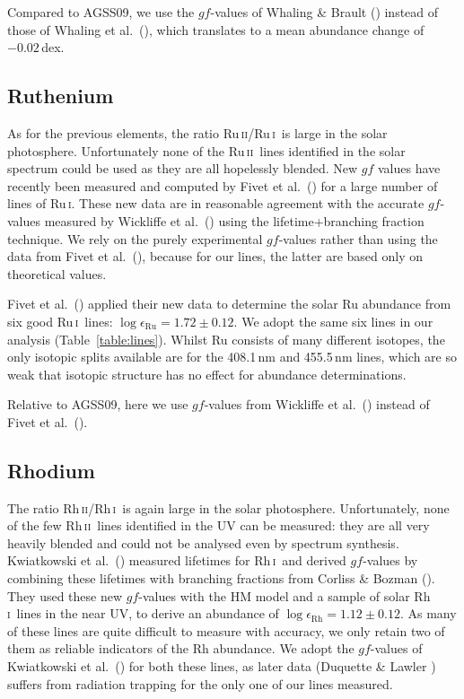 \documentclass[traditabstract]{aa}
\newcommand{\altrui}{Ru\,\textsc{i}}
\newcommand{\altruii}{Ru\,\textsc{ii}}
\newcommand{\altrhi}{Rh\,\textsc{i}}
\newcommand{\altrhii}{Rh\,\textsc{ii}}
\newcommand{\rui}{\altrui\ }
\newcommand{\ruii}{\altruii\ }
\newcommand{\rhi}{\altrhi\ }
\newcommand{\rhii}{\altrhii\ }
\begin{document}
Compared to AGSS09, we use the $gf$-values of Whaling \& Brault (\cite{whal2}) instead of those of Whaling et al.\ (\cite{whal1}), which translates to a mean abundance change of $-0.02$\,dex.

\subsection{Ruthenium}
As for the previous elements, the ratio \altruii/\rui is large in the solar photosphere.
Unfortunately none of the \ruii lines identified in the solar
spectrum could be used as they are all hopelessly blended. New $gf$
values have recently been measured and computed by Fivet et al.\ (\cite{five}) 
for a large number of lines of \altrui. These new data
are in reasonable agreement with the accurate $gf$-values measured by
Wickliffe et al.\ (\cite{wick}) using the lifetime+branching fraction
technique. We rely on the purely experimental $gf$-values rather than using
the data from Fivet et al.\ (\cite{five}), because for our lines, the latter are 
based only on theoretical values.

Fivet et al.\ (\cite{five}) applied their new data to determine the
solar Ru abundance from six good \rui lines: $\log\epsilon_{\mathrm{Ru}}=1.72\pm0.12$. 
We adopt the same six lines in our analysis (Table~\ref{table:lines}).  Whilst Ru consists of
many different isotopes, the only isotopic splits available are for the 408.1\,nm and 
455.5\,nm lines, which are so weak that isotopic structure has no effect for abundance determinations.

Relative to AGSS09, here we use $gf$-values from Wickliffe et al.\ (\cite{wick}) instead of Fivet et al.\ (\cite{five}).

\subsection{Rhodium}
The ratio \altrhii/\rhi is again large in the solar photosphere. Unfortunately, none of the few
\rhii lines identified in the UV can be measured: they are all very
heavily blended and could not be analysed even by spectrum synthesis.
Kwiatkowski et al.\ (\cite{kwia1}) measured  lifetimes for \rhi and
derived $gf$-values by combining these lifetimes with branching
fractions from Corliss \& Bozman (\cite{corl}). They used these
new $gf$-values with the HM model and a sample of solar \rhi lines 
in the near UV, to derive an abundance of $\log\epsilon_{\mathrm{Rh}}=1.12\pm0.12$. As many of these lines
are quite difficult to measure with accuracy, we only retain two of
them as reliable indicators of the Rh abundance.  We adopt the $gf$-values of Kwiatkowski et al.\ (\cite{kwia1})
for both these lines, as later data (Duquette \& Lawler \cite{Duquette}) suffers from radiation trapping for the only one of our lines measured.  
\end{document}
